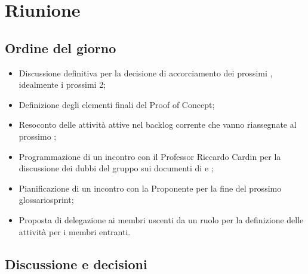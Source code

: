 \section{Riunione}
\subsection{Ordine del giorno}
\begin{itemize}
	\item Discussione definitiva per la decisione di accorciamento dei prossimi , idealmente i prossimi 2;
	\item Definizione degli elementi finali del Proof of Concept;
	\item Resoconto delle attività attive nel backlog corrente che vanno riassegnate al prossimo ;
	\item Programmazione di un incontro con il Professor Riccardo Cardin per la discussione dei dubbi del gruppo sui documenti di \AdR e \PdQ;
	\item Pianificazione di un incontro con la Proponente per la fine del prossimo glossario{sprint};
	\item Proposta di delegazione ai membri uscenti da un ruolo per la definizione delle attività per i membri entranti.
	
\end{itemize}

\subsection{Discussione e decisioni}
